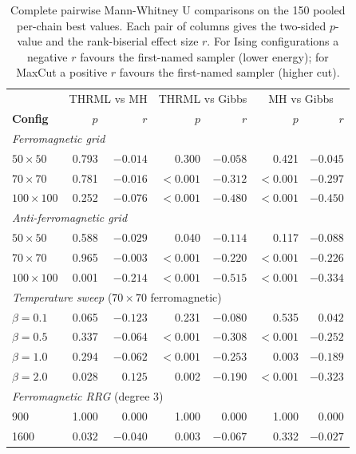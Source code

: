 \documentclass[conference]{IEEEtran}
\begin{document}
\begin{table}[t]
  \caption{Complete pairwise Mann-Whitney U comparisons on the 150 pooled per-chain best values. Each pair of columns gives the two-sided $p$-value and the rank-biserial effect size $r$. For Ising configurations a negative $r$ favours the first-named sampler (lower energy); for MaxCut a positive $r$ favours the first-named sampler (higher cut).}
  \label{tab:full_significance}
  \centering
  \scriptsize
  \setlength{\tabcolsep}{4pt}
  \begin{tabular}{l rr rr rr}
    \hline
    & \multicolumn{2}{c}{THRML vs MH} & \multicolumn{2}{c}{THRML vs Gibbs} & \multicolumn{2}{c}{MH vs Gibbs} \\
    \textbf{Config} & $p$ & $r$ & $p$ & $r$ & $p$ & $r$ \\
    \hline
    \multicolumn{7}{l}{\textit{Ferromagnetic grid}} \\
    $50{\times}50$   & 0.793 & $-0.014$ & 0.300 & $-0.058$ & 0.421 & $-0.045$ \\
    $70{\times}70$   & 0.781 & $-0.016$ & $<0.001$ & $-0.312$ & $<0.001$ & $-0.297$ \\
    $100{\times}100$ & 0.252 & $-0.076$ & $<0.001$ & $-0.480$ & $<0.001$ & $-0.450$ \\
    \multicolumn{7}{l}{\textit{Anti-ferromagnetic grid}} \\
    $50{\times}50$   & 0.588 & $-0.029$ & 0.040 & $-0.114$ & 0.117 & $-0.088$ \\
    $70{\times}70$   & 0.965 & $-0.003$ & $<0.001$ & $-0.220$ & $<0.001$ & $-0.226$ \\
    $100{\times}100$ & 0.001 & $-0.214$ & $<0.001$ & $-0.515$ & $<0.001$ & $-0.334$ \\
    \multicolumn{7}{l}{\textit{Temperature sweep} ($70{\times}70$ ferromagnetic)} \\
    $\beta=0.1$ & 0.065 & $-0.123$ & 0.231 & $-0.080$ & 0.535 & $0.042$ \\
    $\beta=0.5$ & 0.337 & $-0.064$ & $<0.001$ & $-0.308$ & $<0.001$ & $-0.252$ \\
    $\beta=1.0$ & 0.294 & $-0.062$ & $<0.001$ & $-0.253$ & 0.003 & $-0.189$ \\
    $\beta=2.0$ & 0.028 & $0.125$ & 0.002 & $-0.190$ & $<0.001$ & $-0.323$ \\
    \multicolumn{7}{l}{\textit{Ferromagnetic RRG} (degree 3)} \\
    900  & 1.000 & $0.000$ & 1.000 & $0.000$ & 1.000 & $0.000$ \\
    1600 & 0.032 & $-0.040$ & 0.003 & $-0.067$ & 0.332 & $-0.027$ \\

\end{tabular}
\end{table}
\end{document}
